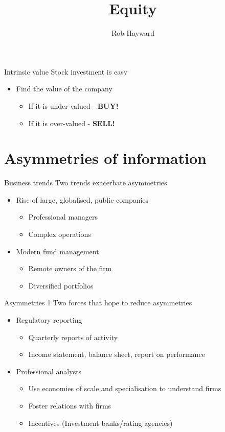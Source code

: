 \documentclass[14pt,xcolor=pdftex,dvipsnames,table]{beamer}\usepackage[]{graphicx}\usepackage[]{color}
\title{Equity}
\author{Rob Hayward}
\begin{document}
\begin{frame}
\titlepage
\end{frame}

\begin{frame}{Intrinsic value}
Stock investment is easy
\begin{itemize}[<+-| alert@+>]
\pause
\item Find the value of the company
\begin{itemize}
\item If it is under-valued - \textbf{BUY!}
\item If it is over-valued - \textbf{SELL!}
\end{itemize}
\end{itemize}
\end{frame}

\section{Asymmetries of information}
\begin{frame}{Business trends}
Two trends exacerbate asymmetries
\begin{itemize}[<+-| alert@+>]
\pause
\item Rise of large, globalised, public companies
\begin{itemize}
\item Professional managers
\item Complex operations
\end{itemize}
\item Modern fund management
\begin{itemize}
\item Remote owners of the firm
\item Diversified portfolios
\end{itemize}
\end{itemize}
\end{frame}

\begin{frame}{Asymmetries 1}
Two forces that hope to reduce asymmetries
\pause
\begin{itemize}[<+-| alert@+>]
\item Regulatory reporting
\begin{itemize}
\item Quarterly reports of activity
\item Income statement, balance sheet, report on performance
\end{itemize}
\item Professional analysts
\begin{itemize}
\item Use economies of scale and specialisation to understand firms
\item Foster relations with firms
\item Incentives (Investment banks/rating agencies)
\end{itemize}
\end{itemize}
\end{frame}
\end{document}
